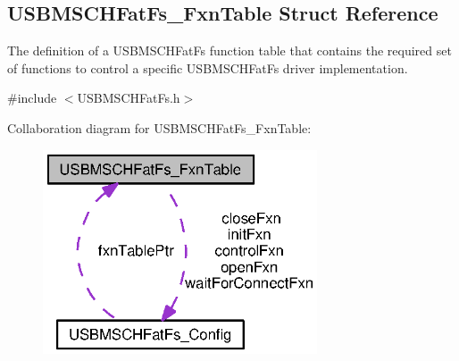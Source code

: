 \subsection{U\+S\+B\+M\+S\+C\+H\+Fat\+Fs\+\_\+\+Fxn\+Table Struct Reference}
\label{struct_u_s_b_m_s_c_h_fat_fs___fxn_table}


The definition of a U\+S\+B\+M\+S\+C\+H\+Fat\+Fs function table that contains the required set of functions to control a specific U\+S\+B\+M\+S\+C\+H\+Fat\+Fs driver implementation.  




{\ttfamily \#include $<$U\+S\+B\+M\+S\+C\+H\+Fat\+Fs.\+h$>$}



Collaboration diagram for U\+S\+B\+M\+S\+C\+H\+Fat\+Fs\+\_\+\+Fxn\+Table\+:
\nopagebreak
\begin{figure}[H]
\begin{center}
\leavevmode
\includegraphics[width=230pt]{struct_u_s_b_m_s_c_h_fat_fs___fxn_table__coll__graph}
\end{center}
\end{figure}
